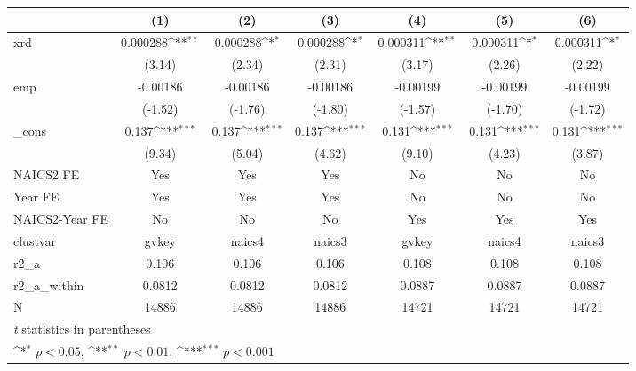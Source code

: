 {
\def\sym#1{\ifmmode^{#1}\else\(^{#1}\)\fi}
\begin{tabular}{l*{6}{c}}
\hline\hline
            &\multicolumn{1}{c}{(1)}         &\multicolumn{1}{c}{(2)}         &\multicolumn{1}{c}{(3)}         &\multicolumn{1}{c}{(4)}         &\multicolumn{1}{c}{(5)}         &\multicolumn{1}{c}{(6)}         \\
\hline
xrd         &    0.000288\sym{**} &    0.000288\sym{*}  &    0.000288\sym{*}  &    0.000311\sym{**} &    0.000311\sym{*}  &    0.000311\sym{*}  \\
            &      (3.14)         &      (2.34)         &      (2.31)         &      (3.17)         &      (2.26)         &      (2.22)         \\
[1em]
emp         &    -0.00186         &    -0.00186         &    -0.00186         &    -0.00199         &    -0.00199         &    -0.00199         \\
            &     (-1.52)         &     (-1.76)         &     (-1.80)         &     (-1.57)         &     (-1.70)         &     (-1.72)         \\
[1em]
\_cons      &       0.137\sym{***}&       0.137\sym{***}&       0.137\sym{***}&       0.131\sym{***}&       0.131\sym{***}&       0.131\sym{***}\\
            &      (9.34)         &      (5.04)         &      (4.62)         &      (9.10)         &      (4.23)         &      (3.87)         \\
[1em]
NAICS2 FE   &         Yes         &         Yes         &         Yes         &          No         &          No         &          No         \\
[1em]
Year FE     &         Yes         &         Yes         &         Yes         &          No         &          No         &          No         \\
[1em]
NAICS2-Year FE&          No         &          No         &          No         &         Yes         &         Yes         &         Yes         \\
\hline
clustvar    &       gvkey         &      naics4         &      naics3         &       gvkey         &      naics4         &      naics3         \\
r2\_a        &       0.106         &       0.106         &       0.106         &       0.108         &       0.108         &       0.108         \\
r2\_a\_within &      0.0812         &      0.0812         &      0.0812         &      0.0887         &      0.0887         &      0.0887         \\
N           &       14886         &       14886         &       14886         &       14721         &       14721         &       14721         \\
\hline\hline
\multicolumn{7}{l}{\footnotesize \textit{t} statistics in parentheses}\\
\multicolumn{7}{l}{\footnotesize \sym{*} \(p<0.05\), \sym{**} \(p<0.01\), \sym{***} \(p<0.001\)}\\
\end{tabular}
}
